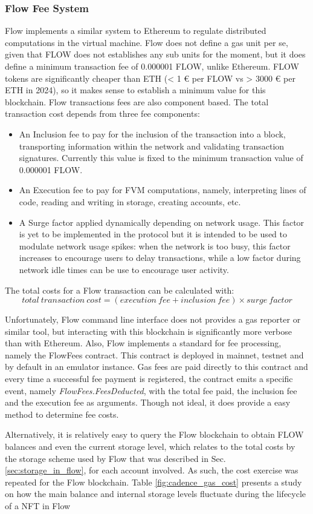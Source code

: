 \documentclass[../main.tex]{subfiles}
\begin{document}
\subsubsection{Flow Fee System}
Flow implements a similar system to Ethereum to regulate distributed computations in the virtual machine. Flow does not define a gas unit per se, given that FLOW does not establishes any sub units for the moment, but it does define a minimum transaction fee of 0.000001 FLOW, unlike Ethereum. FLOW tokens are significantly cheaper than ETH (< 1 € per FLOW vs > 3000 € per ETH in 2024), so it makes sense to establish a minimum value for this blockchain. Flow transactions fees are also component based. The total transaction cost depends from three fee components:
\begin {itemize}
\item {An Inclusion fee} to pay for the inclusion of the transaction into a block, transporting information within the network and validating transaction signatures. Currently this value is fixed to the minimum transaction value of 0.000001 FLOW.
\item {An Execution fee} to pay for FVM computations, namely, interpreting lines of code, reading and writing in storage, creating accounts, etc.
\item {A Surge factor} applied dynamically depending on network usage. This factor is yet to be implemented in the protocol but it is intended to be used to modulate network usage spikes: when the network is too busy, this factor increases to encourage users to delay transactions, while a low factor during network idle times can be use to encourage user activity.
\end{itemize}

The total costs for a Flow transaction can be calculated with:
$$
    total\: transaction\: cost = (execution\: fee + inclusion\: fee) \times surge\: factor
$$

Unfortunately, Flow command line interface does not provides a gas reporter or similar tool, but interacting with this blockchain is significantly more verbose than with Ethereum. Also, Flow implements a standard for fee processing, namely the FlowFees contract. This contract is deployed in mainnet, testnet and by default in an emulator instance. Gas fees are paid directly to this contract and every time a successful fee payment is registered, the contract emits a specific event, namely \textit{FlowFees.FeesDeducted}, with the total fee paid, the inclusion fee and the execution fee as arguments. Though not ideal, it does provide a easy method to determine fee costs.
\par
Alternatively, it is relatively easy to query the Flow blockchain to obtain FLOW balances and even the current storage level, which relates to the total costs by the storage scheme used by Flow that was described in Sec. \ref{sec:storage_in_flow}, for each account involved. As such, the cost exercise was repeated for the Flow blockchain. Table \ref{fig:cadence_gas_cost} presents a study on how the main balance and internal storage levels fluctuate during the lifecycle of a NFT in Flow
\end{document}
